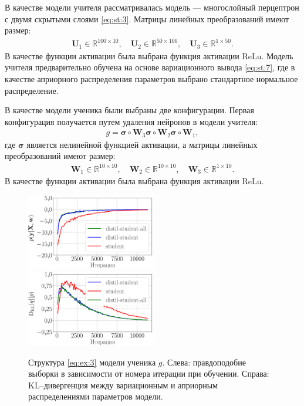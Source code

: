 В качестве модели учителя рассматривалась модель --- многослойный перцептрон с двумя скрытыми слоями \eqref{eq:st:3}. Матрицы линейных преобразований имеют размер:
\[
\label{eq:ex:2}
\begin{aligned}
\mathbf{U}_{1} \in \mathbb{R}^{100 \times 10}, \quad \mathbf{U}_{2} \in \mathbb{R}^{50 \times 100}, \quad \mathbf{U}_{3} \in \mathbb{R}^{1 \times 50}.
\end{aligned}
\]
В качестве функции активации была выбрана функция активации $\text{ReLu}$.
Модель учителя предварительно обучена на основе вариационного вывода \eqref{eq:st:7}, где в качестве априорного распределения параметров выбрано стандартное нормальное распределение.

В качестве модели ученика были выбраны две конфигурации. Первая конфигурация получается путем удаления нейронов в модели учителя:
\[
\label{eq:ex:3}
\begin{aligned}
g = \bm{\sigma} \circ \mathbf{W}_3\bm{\sigma} \circ \mathbf{W}_2\bm{\sigma} \circ \mathbf{W}_1,
\end{aligned}
\]
где $\bm{\sigma}$ является нелинейной функцией активации, а матрицы линейных преобразований имеют размер:
\[
\label{eq:ex:4}
\begin{aligned}
\mathbf{W}_{1} \in \mathbb{R}^{10 \times 10}, \quad \mathbf{W}_{2} \in \mathbb{R}^{10 \times 10},  \quad \mathbf{W}_{3} \in \mathbb{R}^{1 \times 10}.
\end{aligned}
\]
В качестве функции активации была выбрана функция активации $\text{ReLu}$.

\begin{figure}[h!]
\includegraphics[width=0.5\textwidth]{results/bayesdistil/synthetic_likelihood_3_layers.eps}
\includegraphics[width=0.5\textwidth]{results/bayesdistil/synthetic_D_KL_3_layers.eps}
\caption{Структура \eqref{eq:ex:3} модели ученика $g$. Слева: правдоподобие выборки в зависимости от номера итерации при обучении. Справа: KL--дивергенция между вариационным и априорным распределениями параметров модели.}
\label{exp:fig1}
\end{figure}

